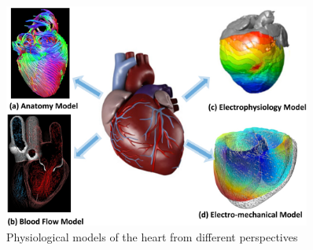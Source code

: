 %




\begin{figure}[!t]
\centering
		\includegraphics[width=0.9\textwidth]{figs/models.pdf}
		
\caption{\small Physiological models of the heart from different perspectives}
\label{fig:models}
\end{figure} 
